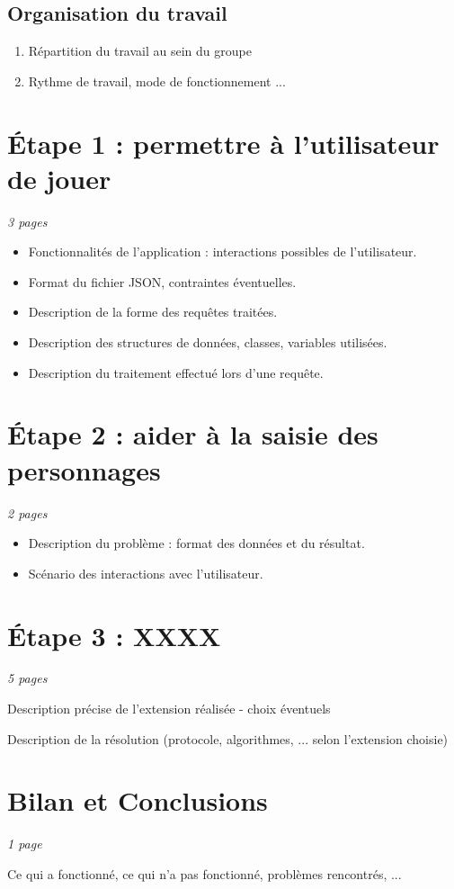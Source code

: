 \documentclass[a4paper]{article}
\begin{document}
\subsection{Organisation du travail}

\begin{enumerate}           %
\item
  Répartition du travail au sein du groupe
\item
  Rythme de travail, mode de fonctionnement ...
\end{enumerate}
\section{Étape 1 : permettre à l'utilisateur de jouer}

\emph{3 pages}

\begin{itemize}         
\item
  Fonctionnalités de l'application : interactions possibles de
  l'utilisateur.
\item
  Format du fichier JSON, contraintes éventuelles.
\item
  Description de la forme des requêtes traitées.
\item
  Description des structures de données, classes, variables utilisées.
\item
  Description du traitement effectué lors d'une requête.
\end{itemize}


\section{Étape 2 : aider  à la saisie  des personnages}

\emph{2 pages}

\begin{itemize}    
\item
  Description du problème : format des données et du résultat.
\item
  Scénario des interactions avec l'utilisateur.
\end{itemize}

\section{Étape 3 : XXXX}

\emph{5 pages}

Description précise de l'extension réalisée - choix éventuels

Description de la résolution (protocole, algorithmes, ... selon l'extension choisie)

\section{Bilan et Conclusions}

\emph{1 page}

Ce qui a fonctionné, ce qui n'a pas fonctionné, problèmes rencontrés, ...
\end{document}
